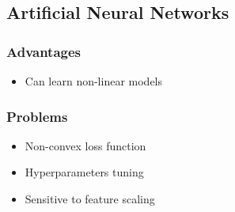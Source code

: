 \subsection{Artificial Neural Networks}

\subsubsection{Advantages}
\begin{itemize}
\item Can learn non-linear models
\end{itemize}
\subsubsection{Problems}
\begin{itemize}
\item Non-convex loss function
\end{itemize}
\begin{itemize}
\item Hyperparameters tuning
\end{itemize}
\begin{itemize}
\item Sensitive to feature scaling
\end{itemize}
